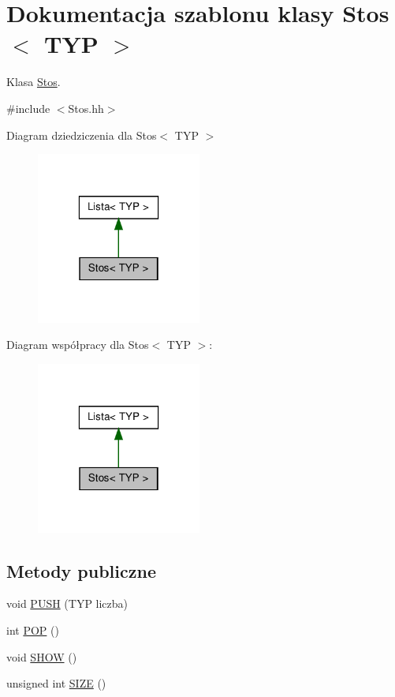 \hypertarget{class_stos}{
\section{Dokumentacja szablonu klasy Stos$<$ TYP $>$}
\label{class_stos}
}


Klasa \hyperlink{class_stos}{Stos}.  




{\ttfamily \#include $<$Stos.hh$>$}



Diagram dziedziczenia dla Stos$<$ TYP $>$
\nopagebreak
\begin{figure}[H]
\begin{center}
\leavevmode
\includegraphics[width=154pt]{class_stos__inherit__graph}
\end{center}
\end{figure}


Diagram współpracy dla Stos$<$ TYP $>$:
\nopagebreak
\begin{figure}[H]
\begin{center}
\leavevmode
\includegraphics[width=154pt]{class_stos__coll__graph}
\end{center}
\end{figure}
\subsection*{Metody publiczne}
\begin{DoxyCompactItemize}
\item 
void \hyperlink{class_stos_a773cf22cb5c67bda0d2878a1ec8bc363}{PUSH} (TYP liczba)
\item 
int \hyperlink{class_stos_ab8b0ecec7cbe0ae761bfee9d9e47d5d4}{POP} ()
\item 
void \hyperlink{class_stos_a8f1c40b779a699c84b20eeb59ca67f06}{SHOW} ()
\item 
unsigned int \hyperlink{class_stos_a6ff0d2aa5946c0dc413e3236ca99fd26}{SIZE} ()
\end{DoxyCompactItemize}


